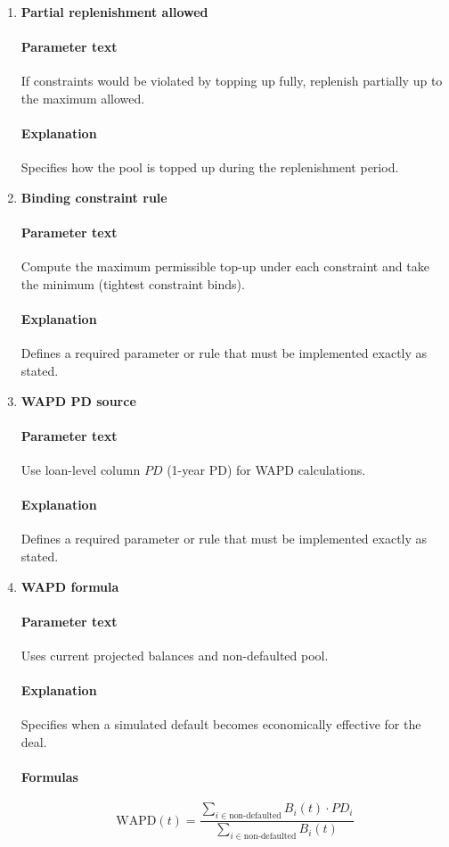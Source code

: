 \documentclass[11pt]{article}
\begin{document}
\begin{enumerate}[label=\arabic*),leftmargin=*,align=left]
\item \textbf{Partial replenishment allowed}
\paragraph{Parameter text} If constraints would be violated by topping up fully, replenish partially up to the maximum allowed.
\paragraph{Explanation} Specifies how the pool is topped up during the replenishment period.

\item \textbf{Binding constraint rule}
\paragraph{Parameter text} Compute the maximum permissible top-up under each constraint and take the minimum (tightest constraint binds).
\paragraph{Explanation} Defines a required parameter or rule that must be implemented exactly as stated.

\item \textbf{WAPD PD source}
\paragraph{Parameter text} Use loan-level column $PD$ (1-year PD) for WAPD calculations.
\paragraph{Explanation} Defines a required parameter or rule that must be implemented exactly as stated.

\item \textbf{WAPD formula}
\paragraph{Parameter text} Uses current projected balances and non-defaulted pool.
\paragraph{Explanation} Specifies when a simulated default becomes economically effective for the deal.
\paragraph{Formulas} 
\[ \text{WAPD}(t) = \frac{\sum_{i \in \text{non-defaulted}} B_i(t) \cdot PD_i}{\sum_{i \in \text{non-defaulted}} B_i(t)} \]


\end{enumerate}
\end{document}
